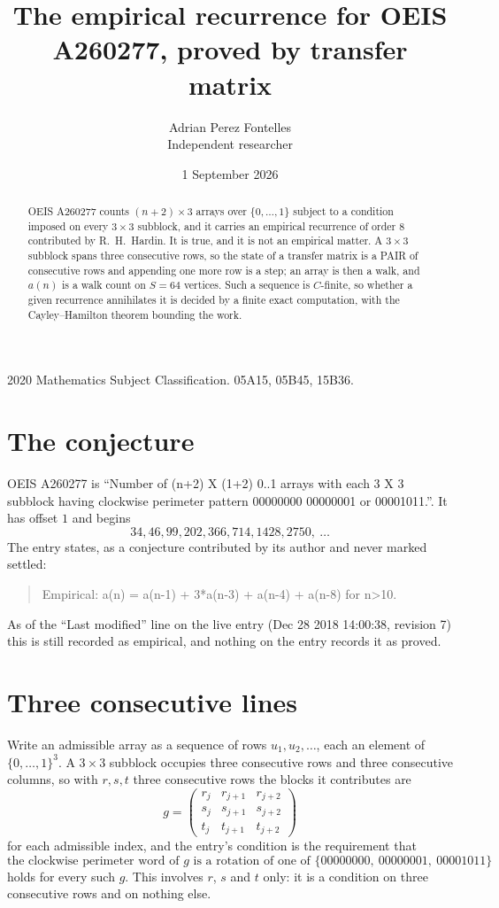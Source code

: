 \documentclass[11pt,a4paper]{article}
\title{The empirical recurrence for OEIS A260277, proved by transfer matrix}
\author{Adrian Perez Fontelles\\ \small Independent researcher}
\date{1 September 2026}
\theoremstyle{plain}
\theoremstyle{definition}
\begin{document}
\maketitle

\begin{abstract}
OEIS A260277 counts $(n+2)\times3$ arrays over $\{0,\dots,1\}$ subject to a condition imposed on
every $3\times3$ subblock, and it carries an empirical recurrence of order $8$
contributed by R.~H.~Hardin. It is true, and it is not an empirical matter. A $3\times3$
subblock spans three consecutive rows, so the state of a transfer matrix is a PAIR of
consecutive rows and appending one more row is a step; an array is then a walk, and
$a(n)$ is a walk count on $S=64$ vertices. Such a sequence is $C$-finite, so whether a given
recurrence annihilates it is decided by a finite exact computation, with the Cayley--Hamilton
theorem bounding the work.
\end{abstract}

\noindent\small 2020 Mathematics Subject Classification. 05A15, 05B45, 15B36.\normalsize

\section{The conjecture}

OEIS A260277 is ``Number of (n+2) X (1+2) 0..1 arrays with each 3 X 3 subblock having clockwise perimeter pattern 00000000 00000001 or 00001011.''. It has offset $1$ and begins
\[
34, 46, 99, 202, 366, 714, 1428, 2750,\ \dots
\]
The entry states, as a conjecture contributed by its author and never marked settled:
\begin{quote}
Empirical: a(n) = a(n-1) + 3*a(n-3) + a(n-4) + a(n-8) for n>10.
\end{quote}
As of the ``Last modified'' line on the live entry (Dec 28 2018 14:00:38, revision 7) this is still
recorded as empirical, and nothing on the entry records it as proved.

\section{Three consecutive lines}

Write an admissible array as a sequence of rows $u_1,u_2,\dots$, each an element of
$\{0,\dots,1\}^{3}$. A $3\times3$ subblock occupies three consecutive rows and
three consecutive columns, so with $r,s,t$ three consecutive rows the blocks it
contributes are
\[
g=\begin{pmatrix}r_j&r_{j+1}&r_{j+2}\\ s_j&s_{j+1}&s_{j+2}\\ t_j&t_{j+1}&t_{j+2}\end{pmatrix}
\]
for each admissible index, and the entry's condition is the requirement that
\[
\text{the clockwise perimeter word of }g\text{ is a rotation of one of }\{00000000,\ 00000001,\ 00001011\}
\]
holds for every such $g$. This involves $r$, $s$ and $t$ only: it is a condition on
three consecutive rows and on nothing else.
\end{document}
